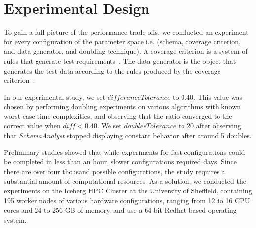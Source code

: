 
\section{Experimental Design}

To gain a full picture of the performance trade-offs, we conducted an experiment for every configuration of the
parameter space i.e. (schema, coverage criterion, and data generator, and doubling technique). A coverage criterion is a
system of rules that generate test requirements~\cite{Ammann2008}. The data generator is the object that generates the
test data according to the rules produced by the coverage criterion~\cite{Ammann2008}.


In our experimental study, we set $\mathit{differanceTolerance}$ to
$0.40$. This value was chosen by performing doubling
experiments on various algorithms with known worst case time
complexities, and observing that the ratio converged to the correct
value when $\mathit{diff} < 0.40$.
We set $\mathit{doublesTolerance}$ to $20$ after observing that
\textit{SchemaAnalyst} stopped displaying constant behavior after around
5 doubles.

Preliminary studies showed that while experiments for
fast configurations could be completed in less than an
hour, slower configurations required days. Since there
are over four thousand possible configurations, the study
requires a substantial amount of computational resources.
As a solution, we conducted the experiments on the Iceberg
HPC Cluster at the University of Sheffield, containing
195 worker nodes of various hardware configurations,
ranging from 12 to 16 CPU cores and 24 to 256 GB of
memory, and use a 64-bit Redhat based operating system.
